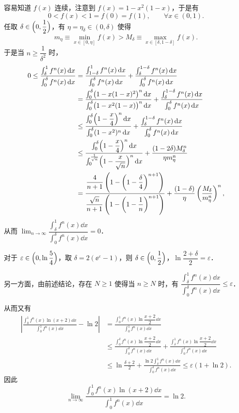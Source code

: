 \begin{solution}
容易知道 $f(x)$ 连续，注意到 $f(x)=1-x^2(1-x)$，于是有
\[
  0<f(x)<1=f(0)=f(1),\qquad \forall x\in(0,1).
\]
任取 $\delta\in\Bigl(0,\dfrac12\Bigr)$，有 $\eta=\eta_\delta\in(0,\delta)$ 使得
\[
  m_\eta\equiv\min_{x\in[0,\eta]}f(x)>M_\delta\equiv\max_{x\in[\delta,1-\delta]}f(x).
\]
于是当 $n\ge\dfrac{1}{\delta^2}$ 时，
\begin{align*}
  0\le\frac{\int_\delta^1 f^n(x)\,\mathrm{d} x}{\int_0^\delta f^n(x)\,\mathrm{d} x}
  &=\frac{\int_{1-\delta}^1 f^n(x)\,\mathrm{d} x}{\int_0^\delta f^n(x)\,\mathrm{d} x}
   +\frac{\int_\delta^{1-\delta}f^n(x)\,\mathrm{d} x}{\int_0^\delta f^n(x)\,\mathrm{d} x}\\
  &=\frac{\int_0^\delta\bigl(1-x(1-x)^2\bigr)^n\,\mathrm{d} x}{\int_0^\delta\bigl(1-x^2(1-x)\bigr)^n\,\mathrm{d} x}
   +\frac{\int_\delta^{1-\delta}f^n(x)\,\mathrm{d} x}{\int_0^\delta f^n(x)\,\mathrm{d} x}\\
  &\le\frac{\int_0^\delta\Bigl(1-\dfrac{x}{4}\Bigr)^n\,\mathrm{d} x}{\int_0^\delta(1-x^2)^n\,\mathrm{d} x}
   +\frac{\int_\delta^{1-\delta}f^n(x)\,\mathrm{d} x}{\int_0^\delta f^n(x)\,\mathrm{d} x}\\
  &\le\frac{\int_0^\delta\Bigl(1-\dfrac{x}{4}\Bigr)^n\,\mathrm{d} x}
          {\int_0^{\frac{1}{\sqrt n}}\Bigl(1-\dfrac{x}{\sqrt n}\Bigr)^n\,\mathrm{d} x}
   +\frac{(1-2\delta)M_\delta^n}{\eta m_\eta^n}\\
  &=\frac{\dfrac{4}{n+1}\left(1-\left(1-\dfrac{\delta}{4}\right)^{n+1}\right)}
          {\dfrac{\sqrt n}{n+1}\left(1-\left(1-\dfrac1n\right)^{n+1}\right)}
   +\frac{(1-\delta)}{\eta}\left(\frac{M_\delta}{m_\eta^n}\right)^{n},
\end{align*}
从而 $\lim_{n\to\infty}\dfrac{\int_\delta^1 f^n(x)\dd x}{\int_0^\delta f^n(x)\dd x}=0$．

对于 $\varepsilon\in\Bigl(0,\ln\dfrac54\Bigr)$，取 $\delta=2(\ee^\varepsilon-1)$，则 $\delta\in\Bigl(0,\dfrac12\Bigr)$，$\ln\dfrac{2+\delta}{2}=\varepsilon$．

另一方面，由前述结论，存在 $N\ge 1$ 使得当 $n\ge N$ 时，有 $\dfrac{\int_\delta^1 f^n(x)\dd x}{\int_0^\delta f^n(x)\dd x}\le\varepsilon$．

从而又有
\begin{align*}
  \left|\frac{\int_0^1 f^n(x)\ln(x+2)\dd x}{\int_0^1 f^n(x)\dd x}-\ln 2\right|
  &=\frac{\int_0^1 f^n(x)\ln\dfrac{x+2}{2}\dd x}{\int_0^1 f^n(x)\dd x}\\
  &\le\frac{\int_0^\delta f^n(x)\ln\dfrac{x+2}{2}\dd x}{\int_0^\delta f^n(x)\dd x}
   +\frac{\int_\delta^1 f^n(x)\ln\dfrac{x+2}{2}\dd x}{\int_0^\delta f^n(x)\dd x}\\
  &\le\ln\frac{\delta+2}{2}
   +\frac{\ln 2\int_\delta^1 f^n(x)\dd x}{\int_0^\delta f^n(x)\dd x}\le\varepsilon(1+\ln 2).
\end{align*}
因此
\[
  \lim_{n\to\infty}\frac{\int_0^1 f^n(x)\ln(x+2)\dd x}{\int_0^1 f^n(x)\dd x}=\ln 2 .
\]
\end{solution}

